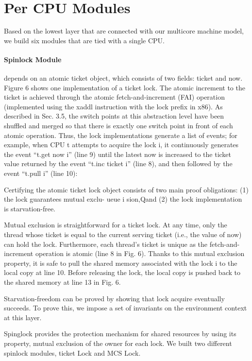 \section{Per CPU Modules}
\label{chapter:certikos:sec:per-cpu-modules}


Based on the lowest layer that are connected with our multicore machine model, 
we build six modules that are tied with a single CPU.

\paragraph{Spinlock Module}

depends on an atomic ticket object, which consists of two fields: ticket and now. Figure 6 shows one implementation of a ticket lock. The atomic increment to the ticket is achieved through the atomic fetch-and-increment (FAI) operation (implemented using the xaddl instruction with the lock prefix in x86). As described in Sec. 3.5, the switch points at this abstraction level have been shuffled and merged so that there is exactly one switch point in front of each atomic operation. Thus, the lock implementations generate a list of events; for example, when CPU t attempts to acquire the lock i, it continuously generates the event
“t.get now i” (line 9) until the latest now is increased to the ticket value returned by the event “t.inc ticket i” (line 8), and then followed by the event “t.pull i” (line 10):

Certifying the atomic ticket lock object consists of two main proof obligations: (1) the lock guarantees mutual exclu-
ueue i
sion,Qand (2) the lock implementation is starvation-free.

Mutual exclusion is straightforward for a ticket lock. At any time, only the thread whose ticket is equal to the current serving ticket (i.e., the value of now) can hold the lock. Furthermore, each thread’s ticket is unique as the fetch-and-increment operation is atomic (line 8 in Fig. 6). Thanks to this mutual exclusion property, it is safe to pull the shared memory associated with the lock i to the local copy at line 10. Before releasing the lock, the local copy is pushed back to the shared memory at line 13 in Fig. 6.

Starvation-freedom can be proved by showing that lock acquire eventually succeeds. To prove this, we impose a set of invariants on the environment context at this layer.


Spinglock provides the protection mechanism for shared resources by using its property, mutual exclusion of the owner for each lock. 
We built two different spinlock modules, ticket Lock and MCS Lock.

